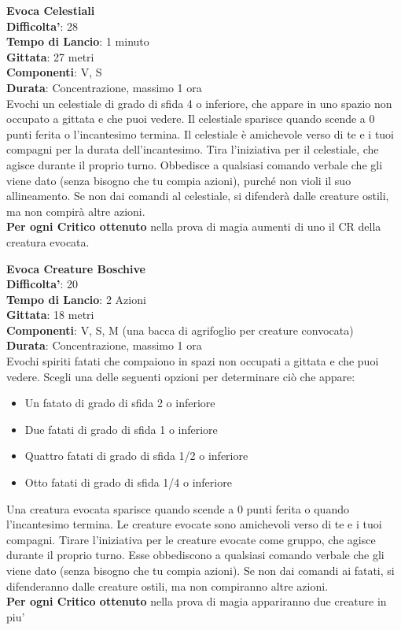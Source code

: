 \begin{multicols}{2}
\medskip\textbf{Evoca Celestiali}\\
\textbf{Difficolta'}: 28\\
\textbf{Tempo di Lancio}: 1 minuto\\
\textbf{Gittata}: 27 metri\\
\textbf{Componenti}: V, S\\
\textbf{Durata}: Concentrazione, massimo 1 ora\\
Evochi un celestiale di grado di sfida 4 o inferiore, che appare in uno spazio non occupato a gittata e che puoi vedere. Il celestiale sparisce quando scende a 0 punti ferita o l’incantesimo termina. Il celestiale è amichevole verso di te e i tuoi compagni per la durata dell’incantesimo. Tira l’iniziativa per il celestiale, che agisce durante il proprio turno. Obbedisce a qualsiasi comando verbale che gli viene dato (senza bisogno che tu compia azioni), purché non violi il suo allineamento. Se non dai comandi al celestiale, si difenderà dalle creature ostili, ma non compirà altre azioni.\\
\textbf{Per ogni Critico ottenuto} nella prova di magia aumenti di uno il CR della creatura evocata.

\medskip\textbf{Evoca Creature Boschive}\\
\textbf{Difficolta'}: 20\\
\textbf{Tempo di Lancio}: 2 Azioni\\
\textbf{Gittata}: 18 metri\\
\textbf{Componenti}: V, S, M (una bacca di agrifoglio per creature convocata)\\
\textbf{Durata}: Concentrazione, massimo 1 ora \\
Evochi spiriti fatati che compaiono in spazi non occupati a gittata e che puoi vedere. Scegli una delle seguenti opzioni per determinare ciò che appare:
\begin{itemize}
\item Un fatato di grado di sfida 2 o inferiore
\item Due fatati di grado di sfida 1 o inferiore
\item Quattro fatati di grado di sfida 1/2 o inferiore
\item Otto fatati di grado di sfida 1/4 o inferiore
\end{itemize}
\medskip
Una creatura evocata sparisce quando scende a 0 punti ferita o quando l’incantesimo termina. Le creature evocate sono amichevoli verso di te e i tuoi compagni. Tirare l’iniziativa per le creature evocate come gruppo, che agisce durante il proprio turno. Esse obbediscono a qualsiasi comando verbale che gli viene dato (senza bisogno che tu compia azioni). Se non dai comandi ai fatati, si difenderanno dalle creature ostili, ma non compiranno altre azioni.\\
\textbf{Per ogni Critico ottenuto} nella prova di magia appariranno due creature in piu'


\end{multicols}
